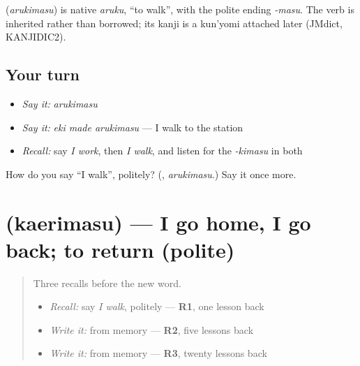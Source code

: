 \begin{cousinweb}
\textbf{} (\emph{arukimasu}) is native \emph{aruku}, \textquotedblleft{}to walk\textquotedblright{}, with the polite ending \emph{-masu}. The verb is inherited rather than borrowed; its kanji is a kun'yomi attached later (JMdict, KANJIDIC2).
\end{cousinweb}

\subsection*{Your turn}
\begin{itemize}
\raggedright
  \item \emph{Say it:} \emph{arukimasu}
  \item \emph{Say it:} \emph{eki made arukimasu} — I walk to the station
  \item \emph{Recall:} say \emph{I work}, then \emph{I walk}, and listen for the \emph{-kimasu} in both
\end{itemize}

\begin{tcolorbox}[breakable,colback=teal!4,colframe=teal!35!black,title={Before you move on}]
How do you say \textquotedblleft{}I walk\textquotedblright{}, politely? (\textbf{}, \emph{arukimasu}.) Say it once more.
\end{tcolorbox}
\section[\texorpdfstring{\ja{かえります} (kaerimasu)}{かえります (kaerimasu)}]{ (kaerimasu) — I go home, I go back; to return (polite)}

\label{lesson:JA-C138-kaerimasu}



\begin{quote}
Three recalls before the new word.

\begin{itemize}
\raggedright
  \item \emph{Recall:} say \emph{I walk}, politely — \textbf{R1}, one lesson back
  \item \emph{Write it:} \textbf{} from memory — \textbf{R2}, five lessons back
  \item \emph{Write it:} \textbf{} from memory — \textbf{R3}, twenty lessons back
\end{itemize}
\end{quote}

